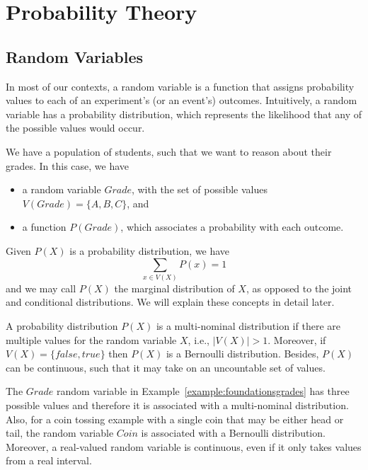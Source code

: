 \chapter{Probability Theory}

\section{Random Variables}

In most of our contexts, a random variable is a function that assigns probability values to each of an experiment's (or an event's) outcomes. Intuitively, a random variable has a probability distribution, which represents the likelihood that any of the possible values would occur.

\begin{example}\label{example:foundationsgrades}
We have a population of students, such that we want to reason about their grades. In this case, we have 
\begin{itemize}
    \item a random variable $Grade$, with the set of possible values $V(Grade)=\{ A, B, C \}$, and 
    \item a function $P(Grade)$, which associates a probability with each outcome. 
\end{itemize}
\end{example}



Given $P(X)$ is a probability distribution, we have 
\begin{equation}
    \sum_{x\in V(X)} P(x) = 1
\end{equation}
and we may call $P(X)$ the marginal distribution of $X$, as opposed to the joint and conditional distributions. We will explain these concepts in detail later.  

A probability distribution $P(X)$ is a multi-nominal distribution if there are multiple values for the random variable $X$, i.e., $|V(X)|>1$. Moreover, if $V(X)=\{false,true\}$ then $P(X)$ is a Bernoulli distribution. Besides, $P(X)$ can be continuous, such that it may take on an uncountable set of values. 

\begin{example}
The $Grade$ random variable in Example~\ref{example:foundationsgrades} has three possible values and therefore it is associated with a multi-nominal distribution. Also, for a coin tossing example with a single coin that may be either head or tail, the random variable $Coin$ is associated with a Bernoulli distribution. Moreover, a real-valued random variable is continuous, even if it only takes values from a real interval. 
\end{example}



